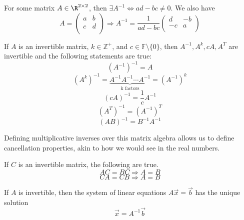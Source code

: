 \begin{theorem}
    For some matrix \(A\in\R^{2\times 2}\), then \(\exists A^{-1}\Leftrightarrow ad-bc\neq 0 \). We also have
    \[
        A=\begin{pmatrix}
            a &b   \\
           c  & d  \\
        \end{pmatrix}\Longrightarrow A^{-1} =\frac{1}{ad-bc}\begin{pmatrix}
            d &-b   \\
             -c&a   \\
        \end{pmatrix}
    \]
\end{theorem}
\begin{theorem}\label{prowotogen}
    If \(A\) is an invertible matrix, \(k\in\mathbb{Z} ^+\), and \(c\in\mathbb{F} \setminus \{ 0 \} \), then \(A^{-1},A^k ,cA,A^T \) are invertible and the following statements are true:
    \[
        (A^{-1} )^{-1} =A
    \]
    \[
        (A^k)^{-1} =\underbrace{A^{-1} A^{-1} \cdots A^{-1} }_\text{k factors}=(A^{-1} )^k
    \]
    \[
        (cA)^{-1} =\frac{1}{c}A^{-1} 
    \]
    \[
        (A^T)^{-1} =(A^{-1} )^T
    \]
    \[
        (AB)^{-1}=B^{-1} A^{-1} 
    \]
\end{theorem}
Defining multiplicative inverses over this matrix algebra allows us to define cancellation properties, akin to how we would see in the real numbers. 
\begin{theorem}
    If \(C\) is an invertible matrix, the following are true. 
    \[
        AC=BC\Longrightarrow A=B
    \]
    \[
        CA=CB\Longrightarrow A=B
    \]
\end{theorem}
\begin{theorem}
    If \(A\) is invertible, then the system of linear equations \(A\vec{x}=\vec{b}\) has the unique solution
    \[
        \vec{x}=A^{-1} \vec{b}
    \]
\end{theorem}
